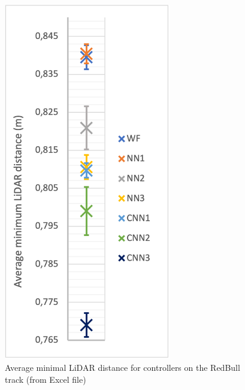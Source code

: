 \begin{figure}
\begin{minipage}{0.45\textwidth}
        \includegraphics[width=0.65\textwidth]{Figures/H1_LiDAR.png}
        \caption{Average minimal LiDAR distance for controllers on the RedBull track (from Excel file)}
        \label{h1_lidar}
    \end{minipage}
\end{figure}


